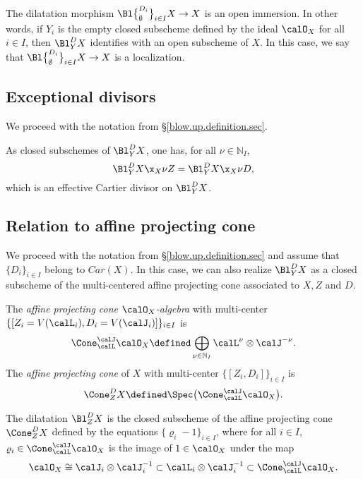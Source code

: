 \documentclass[10pt]{alggeom}
\theoremstyle{definition}
\numberwithin{equation}{section}
\begin{document}
\fact \cite{Du05, Ma23d} The dilatation morphism $ \Bl \big\{ _{\emptyset}^{D_i } \big\}_{i\in I} X \to X$ is an open immersion. In other words, if $Y_i $ is the empty closed subscheme defined by the ideal $\calO _X$ for all $i \in I $, then $\Bl _Y^D X $ identifies with an open subscheme of $X$. In this case, we say that  $\Bl \big\{ _{\emptyset}^{D_i } \big\}_{i\in I} X \to X$ is a localization.
\xfact 



\subsection{Exceptional divisors}

We proceed with the notation from \S\ref{blow.up.definition.sec}.

 \label{blow.up.Cartier.lemm}
As closed subschemes of $\Bl_Y^DX$, one has, for all $\nu \in \mathbb{N}_I$,
\[
\Bl_Y^DX\x_X \nu Z=\Bl_Y^DX\x_X \nu D,
\]
which is an effective Cartier divisor on $\Bl_Y^DX$.
\xprop




\subsection{Relation to affine projecting cone}

We proceed with the notation from \S\ref{blow.up.definition.sec} and assume that $\{D_i\} _{i \in I}$ belong to $Car(X)$. In this case, we can also realize $\Bl_Y^DX$ as a
closed subscheme of the multi-centered affine projecting cone associated to $X,Z$ and $D$. 

The {\em affine projecting cone  $\calO_X$-algebra } with multi-center $\{[Z_i=V(\calL_i) , D_i = V (\calJ _i)]\}_{i \in I} $ is
\[
\Cone_{\calL}^{\calJ} \calO_ X\defined\bigoplus_{\nu \in \mathbb{N} _I} \calL^\nu \otimes\calJ^{-\nu}.
\]
The {\em affine projecting cone }  of $X$ with multi-center $\{[Z_i , D_i]\}_{i \in I} $ is \[ \Cone _Z^D X \defined \Spec \big( \Cone_{\calL}^{\calJ} \calO_ X \big).\]
\xdefi


 \label{blow.up.closed.in.cone.lemm} The dilatation $\Bl_Z^DX$ is the closed
subscheme of the affine projecting cone $\Cone_Z^DX$ defined by the equations $\{\varrho_i-1\}_{i\in I} $,
where  for all $i \in I$, $\varrho _i\in \Cone_{\calL}^{\calJ} \calO_ X$ is the image of $1 \in \calO _X$ under the map
\[\calO_X \cong\calJ _i\otimes\calJ _i ^{-1}\subset \calL _i\otimes\calJ _i^{-1} \subset \Cone_{\calL}^{\calJ} \calO_ X. \]
\xprop
\end{document}
